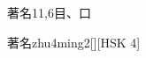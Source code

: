 \begin{entry}{著名}{11,6}{⽬、⼝}
  \begin{phonetics}{著名}{zhu4ming2}[][HSK 4]
  \end{phonetics}
\end{entry}
